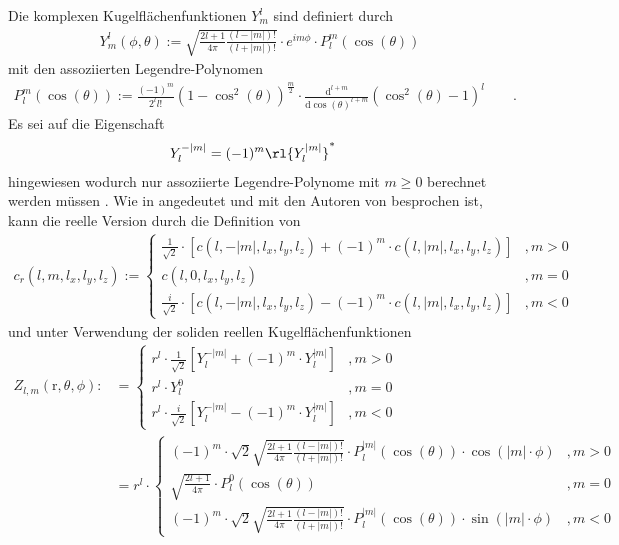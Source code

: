 %
Die komplexen Kugelflächenfunktionen $Y^l_m$ sind definiert 
durch
%
\begin{align}
Y^l_m(\phi,\theta):=\sqrt{\frac{2l+1}{4\pi}\frac{(l-|m|)!}{(l+|m|)!}}\cdot
 e^{i m \phi} \cdot P^{m}_l(\cos(\theta))
\end{align}
%
mit den assoziierten Legendre-Polynomen
%
\begin{align}
P^m_l(\cos(\theta)):=\frac{(-1)^m}{2^ll!}(1-\cos^2(\theta))^{\frac{m}{2}}\cdot
\frac{\text{d}^{l+m}}{\text{d}\cos(\theta)^{l+m}}(\cos^2(\theta)-1)^l\qquad.
\end{align}
%
Es sei auf die Eigenschaft%
%
\begin{align}
Y^{-|m|}_l&=(-1)^m \rl{Y^{|m|}_l}^*
\end{align}
%
hingewiesen wodurch nur assoziierte Legendre-Polynome mit $m\geq0$ berechnet 
werden müssen \cite{b:4a}. Wie in 
\cite{av:4a} angedeutet und mit den Autoren von \cite{av:1a} 
besprochen ist, kann die reelle Version durch die Definition 
von
%
\begin{align}
c_r(l,m,l_x,l_y,l_z):=\begin{cases}
\frac{1}{\sqrt{2}}\cdot 
\left[c(l,-|m|,l_x,l_y,l_z)+(-1)^m\cdot 
c(l,|m|,l_x,l_y,l_z)\right]& , m>0 \\
c(l,0,l_x,l_y,l_z) & , m=0 \\
\frac{i}{\sqrt{2}}\cdot 
\left[c(l,-|m|,l_x,l_y,l_z)-(-1)^m\cdot 
c(l,|m|,l_x,l_y,l_z)\right]& , m<0
\end{cases}
\end{align}
%
und unter Verwendung der soliden reellen 
Kugelflächenfunktionen
%
\begin{align}
Z_{l,m}(\text{r},\theta,\phi):&=\begin{cases}
r^l\cdot\frac{1}{\sqrt{2}}\left[Y^{-|m|}_l+(-1)^m\cdot 
Y^{|m|}_l\right] & , m>0\\
r^l \cdot Y^0_l & , m=0 \\
r^l\cdot\frac{i}{\sqrt{2}}\left[Y^{-|m|}_l-(-1)^m\cdot 
Y^{|m|}_l\right]& , m<0
\end{cases}\\
&=r^l\cdot\begin{cases}
(-1)^m \cdot  
\sqrt{2}\sqrt{\frac{2l+1}{4\pi}\frac{(l-|m|)!}{(l+|m|)!}}\cdot
P^{|m|}_l(\cos(\theta))\cdot \cos(|m|\cdot \phi)& , m>0\\
\sqrt{\frac{2l+1}{4\pi}}\cdot P^{0}_l(\cos(\theta))&, m=0\\
(-1)^m\cdot \sqrt{2} 
\sqrt{\frac{2l+1}{4\pi}\frac{(l-|m|)!}{(l+|m|)!}}\cdot P^{|m|}_l(\cos(\theta)) 
\cdot \sin(|m|\cdot \phi) &, m<0
\end{cases}
\end{align}
